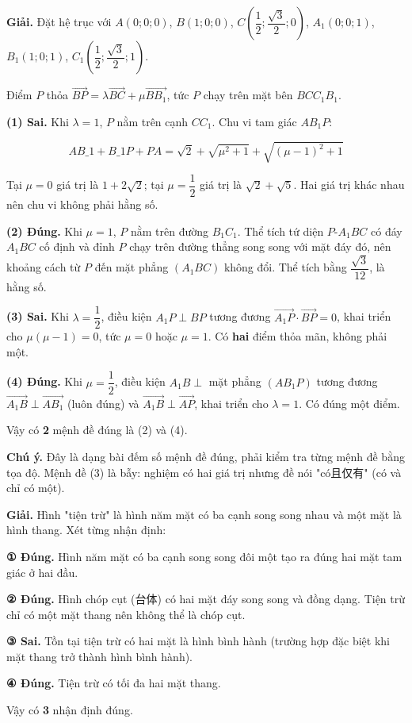 \documentclass[11pt, a4paper]{article}
\begin{document}
\begin{dapan}[3 — Đáp án B]
\textbf{Giải.} Đặt hệ trục với $A(0;0;0)$, $B(1;0;0)$, $C\left(\dfrac{1}{2};\dfrac{\sqrt{3}}{2};0\right)$, $A_1(0;0;1)$, $B_1(1;0;1)$, $C_1\left(\dfrac{1}{2};\dfrac{\sqrt{3}}{2};1\right)$.

Điểm $P$ thỏa $\vec{BP} = \lambda\vec{BC} + \mu\vec{BB_1}$, tức $P$ chạy trên mặt bên $BCC_1B_1$.

\textbf{(1) Sai.} Khi $\lambda = 1$, $P$ nằm trên cạnh $CC_1$. Chu vi tam giác $AB_1P$:

$$AB\_1 + B\_1P + PA = \sqrt{2} + \sqrt{\mu^2+1} + \sqrt{(\mu-1)^2+1}$$

Tại $\mu = 0$ giá trị là $1 + 2\sqrt{2}$; tại $\mu = \dfrac{1}{2}$ giá trị là $\sqrt{2} + \sqrt{5}$. Hai giá trị khác nhau nên chu vi không phải hằng số.

\textbf{(2) Đúng.} Khi $\mu = 1$, $P$ nằm trên đường $B_1C_1$. Thể tích tứ diện $P\text{-}A_1BC$ có đáy $A_1BC$ cố định và đỉnh $P$ chạy trên đường thẳng song song với mặt đáy đó, nên khoảng cách từ $P$ đến mặt phẳng $(A_1BC)$ không đổi. Thể tích bằng $\dfrac{\sqrt{3}}{12}$, là hằng số.

\textbf{(3) Sai.} Khi $\lambda = \dfrac{1}{2}$, điều kiện $A_1P \perp BP$ tương đương $\vec{A_1P} \cdot \vec{BP} = 0$, khai triển cho $\mu(\mu-1) = 0$, tức $\mu = 0$ hoặc $\mu = 1$. Có \textbf{hai} điểm thỏa mãn, không phải một.

\textbf{(4) Đúng.} Khi $\mu = \dfrac{1}{2}$, điều kiện $A_1B \perp$ mặt phẳng $(AB_1P)$ tương đương $\vec{A_1B} \perp \vec{AB_1}$ (luôn đúng) và $\vec{A_1B} \perp \vec{AP}$, khai triển cho $\lambda = 1$. Có đúng một điểm.

Vậy có \textbf{2} mệnh đề đúng là (2) và (4).

\textbf{Chú ý.} Đây là dạng bài đếm số mệnh đề đúng, phải kiểm tra từng mệnh đề bằng tọa độ. Mệnh đề (3) là bẫy: nghiệm có hai giá trị nhưng đề nói "có且仅有" (có và chỉ có một).
\end{dapan}

\begin{dapan}[4 — Đáp án C]
\textbf{Giải.} Hình "tiện trừ" là hình năm mặt có ba cạnh song song nhau và một mặt là hình thang. Xét từng nhận định:

\textbf{① Đúng.} Hình năm mặt có ba cạnh song song đôi một tạo ra đúng hai mặt tam giác ở hai đầu.

\textbf{② Đúng.} Hình chóp cụt (台体) có hai mặt đáy song song và đồng dạng. Tiện trừ chỉ có một mặt thang nên không thể là chóp cụt.

\textbf{③ Sai.} Tồn tại tiện trừ có hai mặt là hình bình hành (trường hợp đặc biệt khi mặt thang trở thành hình bình hành).

\textbf{④ Đúng.} Tiện trừ có tối đa hai mặt thang.

Vậy có \textbf{3} nhận định đúng.
\end{dapan}
\end{document}
